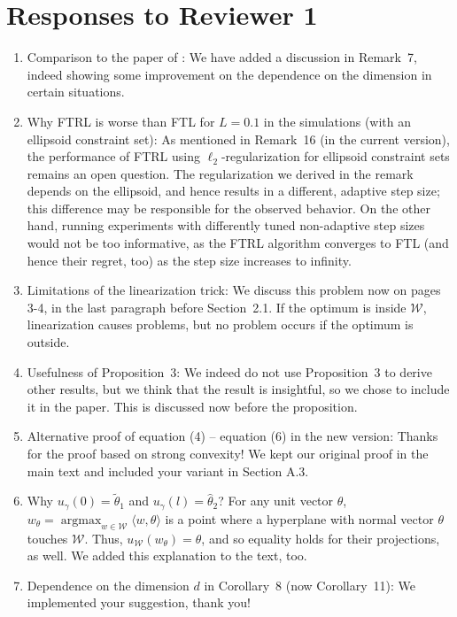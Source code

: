\documentclass[10pt,english]{article}
\newcommand{\cW}{\mathcal{W}}
\newcommand{\inpro}[2]{\langle #1, #2\rangle}
\newcommand{\ttheta}{\tilde{\theta}}
\newcommand{\htheta}{\hat{\theta}}
\DeclareMathOperator{\argmax}{argmax}
\begin{document}
\section*{Responses to Reviewer 1}
\begin{enumerate}
\item Comparison to the paper of \citet{koolen2016combining}: We have added a discussion in Remark~7, indeed showing some improvement on the dependence on the dimension in certain situations.
\item %
Why FTRL is worse than FTL for $L=0.1$ in the simulations (with an ellipsoid constraint set): As mentioned in Remark~16 (in the current version), the performance of FTRL using $\ell_2$-regularization for ellipsoid constraint sets remains an open question. The regularization we derived in the remark depends on the ellipsoid, and hence results in a different, adaptive step size; this difference may be responsible for the observed behavior. On the other hand, running experiments with differently tuned non-adaptive step sizes would not be too informative, as the FTRL algorithm converges to FTL (and hence their regret, too) as the step size increases to infinity.

\item Limitations of the linearization trick:	We discuss this problem now on pages 3-4, in the last paragraph before Section~2.1. If the optimum is inside $\mathcal{W}$, linearization causes problems, but no problem occurs if the optimum is outside.
\item Usefulness of Proposition~3: We indeed do not use Proposition~3 to derive other results, but we think that the result is insightful, so we chose to include it in the paper. This is discussed now before the proposition.
\item Alternative proof of equation (4) -- equation (6) in the new version: Thanks for the proof based on strong convexity! We kept our original proof in the main text and included your variant in Section A.3.
\item Why $u_\gamma(0) = \ttheta_1$ and $u_\gamma(l) = \htheta_2$? For any unit vector $\theta$, $w_\theta=\argmax_{w \in \cW} \inpro{w}{\theta}$ is a point where a hyperplane with normal vector $\theta$ touches $\cW$. Thus, $u_{\cW}(w_\theta)=\theta$, and so equality holds for their projections, as well. We added this explanation to the text, too.
\item Dependence on the dimension $d$ in Corollary~8 (now Corollary~11): We implemented your suggestion, thank you!
\end{enumerate}
\end{document}
